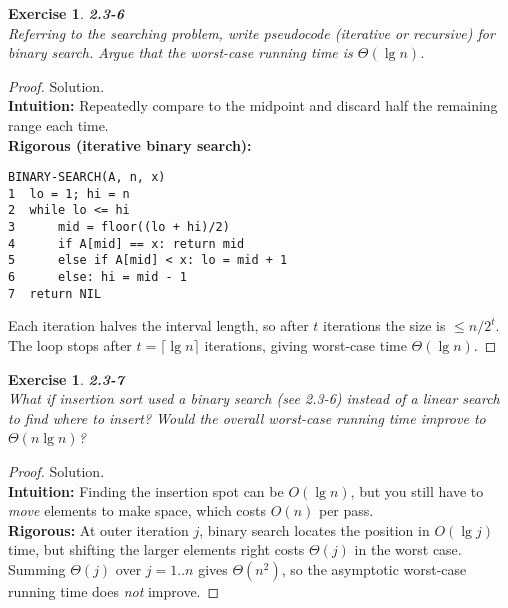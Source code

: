 \documentclass[12pt]{article}
\newtheorem{exercise}[theorem]{Exercise}
\theoremstyle{definition}
\begin{document}
\newpage

\begin{exercise}
\noindent
\textbf{2.3-6}\\
\noindent
Referring to the searching problem, write pseudocode (iterative or recursive)
for binary search. Argue that the worst-case running time is $\Theta(\lg n)$.
\end{exercise}

\vspace{1pt}

\begin{proof}
Solution.\\

\noindent
\textbf{Intuition:} Repeatedly compare to the midpoint and discard half the
remaining range each time.\\

\noindent
\textbf{Rigorous (iterative binary search):}
\begin{verbatim}
BINARY-SEARCH(A, n, x)
1  lo = 1; hi = n
2  while lo <= hi
3      mid = floor((lo + hi)/2)
4      if A[mid] == x: return mid
5      else if A[mid] < x: lo = mid + 1
6      else: hi = mid - 1
7  return NIL
\end{verbatim}
Each iteration halves the interval length, so after $t$ iterations the size is
$\le n/2^t$. The loop stops after $t=\lceil\lg n\rceil$ iterations, giving
worst-case time $\Theta(\lg n)$.
\end{proof}

\newpage

\begin{exercise}
\noindent
\textbf{2.3-7}\\
\noindent
What if insertion sort used a binary search (see 2.3-6) instead of a linear
search to find where to insert? Would the overall worst-case running time
improve to $\Theta(n\lg n)$?
\end{exercise}

\vspace{1pt}

\begin{proof}
Solution.\\

\noindent
\textbf{Intuition:} Finding the insertion spot can be $O(\lg n)$, but you still
have to \emph{move} elements to make space, which costs $O(n)$ per pass.\\

\noindent
\textbf{Rigorous:} At outer iteration $j$, binary search locates the position in
$O(\lg j)$ time, but shifting the larger elements right costs $\Theta(j)$ in the
worst case. Summing $\Theta(j)$ over $j=1..n$ gives $\Theta(n^2)$, so the
asymptotic worst-case running time does \emph{not} improve.
\end{proof}
\end{document}
